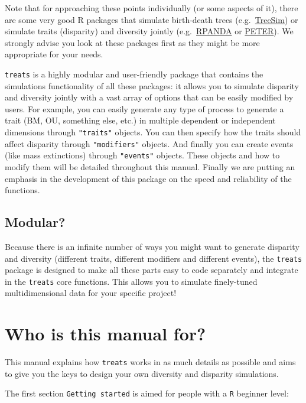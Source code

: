 \documentclass[
]{book}
\begin{document}
Note that for approaching these points individually (or some aspects of it), there are some very good R packages that simulate birth-death trees (e.g.~\href{https://github.com/tanja819/TreeSim}{TreeSim}) or simulate traits (disparity) and diversity jointly (e.g.~\href{https://github.com/cran/RPANDA}{RPANDA} or \href{https://github.com/PuttickMacroevolution/PETER}{PETER}).
We strongly advise you look at these packages first as they might be more appropriate for your needs.

\texttt{treats} is a highly modular and user-friendly package that contains the simulations functionality of all these packages: it allows you to simulate disparity and diversity jointly with a vast array of options that can be easily modified by users.
For example, you can easily generate any type of process to generate a trait (BM, OU, something else, etc.) in multiple dependent or independent dimensions through \texttt{"traits"} objects.
You can then specify how the traits should affect disparity through \texttt{"modifiers"} objects.
And finally you can create events (like mass extinctions) through \texttt{"events"} objects.
These objects and how to modify them will be detailed throughout this manual.
Finally we are putting an emphasis in the development of this package on the speed and reliability of the functions.

\hypertarget{modular}{%
\subsection{Modular?}\label{modular}}

Because there is an infinite number of ways you might want to generate disparity and diversity (different traits, different modifiers and different events), the \texttt{treats} package is designed to make all these parts easy to code separately and integrate in the \texttt{treats} core functions.
This allows you to simulate finely-tuned multidimensional data for your specific project!

\hypertarget{who-is-this-manual-for}{%
\section{Who is this manual for?}\label{who-is-this-manual-for}}

This manual explains how \texttt{treats} works in as much details as possible and aims to give you the keys to design your own diversity and disparity simulations.

The first section \texttt{Getting\ started} is aimed for people with a \texttt{R} beginner level:
\end{document}

